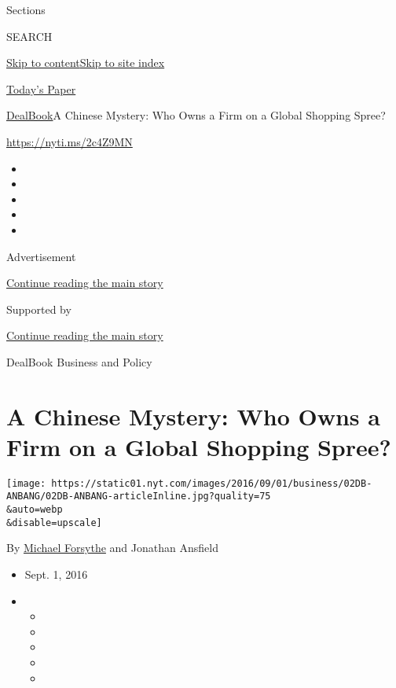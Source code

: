 Sections

SEARCH

\protect\hyperlink{site-content}{Skip to
content}\protect\hyperlink{site-index}{Skip to site index}

\href{https://myaccount.nytimes.com/auth/login?response_type=cookie\&client_id=vi}{}

\href{https://www.nytimes.com/section/todayspaper}{Today's Paper}

\href{/section/business/dealbook}{DealBook}\textbar{}A Chinese Mystery:
Who Owns a Firm on a Global Shopping Spree?

\url{https://nyti.ms/2c4Z9MN}

\begin{itemize}
\item
\item
\item
\item
\item
\end{itemize}

Advertisement

\protect\hyperlink{after-top}{Continue reading the main story}

Supported by

\protect\hyperlink{after-sponsor}{Continue reading the main story}

DealBook Business and Policy

\hypertarget{a-chinese-mystery-who-owns-a-firm-on-a-global-shopping-spree}{%
\section{A Chinese Mystery: Who Owns a Firm on a Global Shopping
Spree?}\label{a-chinese-mystery-who-owns-a-firm-on-a-global-shopping-spree}}

\texttt{[image: https://static01.nyt.com/images/2016/09/01/business/02DB-ANBANG/02DB-ANBANG-articleInline.jpg?quality=75\\\&auto=webp\\\&disable=upscale]}

By \href{http://www.nytimes.com/by/michael-forsythe}{Michael Forsythe}
and Jonathan Ansfield

\begin{itemize}
\item
  Sept. 1, 2016
\item
  \begin{itemize}
  \item
  \item
  \item
  \item
  \item
  \end{itemize}
\end{itemize}

